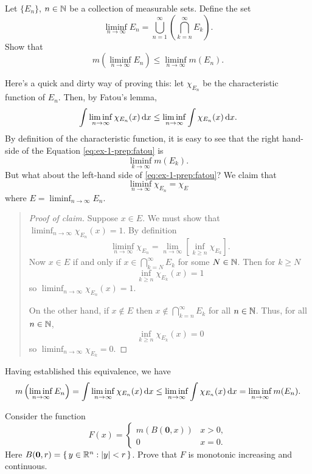\begin{problem}
  Let \(\{E_n\}\), \(n\in\mathbb{N}\) be a collection of measurable sets. Define
  the set
  \[
    \liminf_{n\to\infty} E_n
    =\bigcup_{n=1}^\infty\left(\bigcap_{k=n}^\infty E_k\right).
  \]
  Show that
  \[
    m\left(\liminf_{n\to\infty}
      E_n\right)\leq\liminf_{n\to\infty}m(E_n).
  \]
\end{problem}
\begin{solution}
  Here's a quick and dirty way of proving this: let \(\chi_{E_n}\) be the
  characteristic function of \(E_n\). Then, by Fatou's lemma,
  \begin{equation}
    \label{eq:ex-1-prep:fatou}
    \int\liminf_{n\to\infty}\chi_{E_n}(x)\mathop{}\!\mathrm{d} x
    \leq\liminf_{n\to\infty}\int\chi_{E_n}(x)\mathop{}\!\mathrm{d} x.
  \end{equation}
  By definition of the characteristic function, it is easy to see that the
  right hand-side of the Equation \eqref{eq:ex-1-prep:fatou} is
  \[
    \liminf_{k\to\infty}m(E_k).
  \]
  But what about the left-hand side of \eqref{eq:ex-1-prep:fatou}? We claim
  that
  \[
    \liminf_{n\to\infty}\chi_{E_n}=\chi_{E}
  \]
  where \(E=\liminf_{n\to\infty} E_n\).
  \begin{quote}
    \begin{proof}[Proof of claim]
      Suppose \(x\in E\). We must show that
      \(\liminf_{n\to\infty}\chi_{E_n}(x)=1\). By definition
      \[
        \liminf_{n\to\infty}\chi_{E_n}=%
        \lim_{n\to\infty}\left[\inf_{k\geq n}\chi_{E_k}\right].
      \]
      Now \(x\in E\) if and only if \(x\in \bigcap_{k=N}^\infty E_k\) for
      some \(N\in\mathbb{N}\). Then for \(k\geq N\)
      \[
        \inf_{k\geq n}\chi_{E_k}(x)=1
      \]
      so \(\liminf_{n\to\infty}\chi_{E_n}(x)=1\).

      On the other hand, if \(x\notin E\) then
      \(x\notin\bigcap_{k=n}^\infty E_k\) for all \(n\in\mathbb{N}\). Thus, for
      all \(n\in\mathbb{N}\),
      \[
        \inf_{k\geq n}\chi_{E_k}(x)=0
      \]
      so \(\liminf_{n\to\infty}\chi_{E_k}=0\).
    \end{proof}
  \end{quote}
  Having established this equivalence, we have
  \[
    m\left(\liminf_{n\to\infty}E_n\right)=%
    \int\liminf_{n\to\infty}\chi_{E_n}(x)\diff x\leq%
    \liminf_{n\to\infty}\int\chi_{E_n}(x)\diff x=%
    \liminf_{n\to\infty}m(E_n).
  \]
\end{solution}

\begin{problem}
  Consider the function
  \[
    F(x)=
    \begin{cases}
      m(B(\mathbf{0},x))&x>0,\\
      0&x=0.
    \end{cases}
  \]
  Here \(B(\mathbf{0},r)=\left\{\, y \in\mathbb{R}^n:| y |<r\,\right\}\). Prove
  that \(F\) is monotonic increasing and continuous.
\end{problem}

